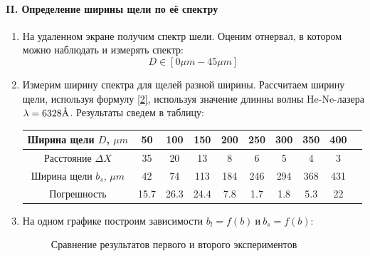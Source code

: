 \documentclass[12pt]{article}
\let\oldAA\AA
\renewcommand{\AA}{\text{\normalfont\oldAA}}
\begin{document}
\paragraph{II. Определение ширины щели по её спектру}
\begin{enumerate}
    \item На удаленном экране получим спектр шели. Оценим отнервал, в котором можно наблюдать и измерять спектр: \\
    \[ D \in [ 0\mu m - 45\mu m ] \]
    
    \item Измерим ширину спектра для щелей разной ширины. Рассчитаем ширину щели, используя формулу \ref{2}, используя значение длинны волны He-Ne-лазера $ \lambda = 6328 \AA $. Результаты сведем в таблицу:\\
    \begin{tabu} to 1\textwidth{|c|c|c|c|c|c|c|c|c|c|}
    \hline
    Ширина щели $D$, $\mu m$ & 50 & 100 & 150 & 200 & 250 & 300 & 350 & 400 \\
    \hline
    Расстояние $\Delta X$ & 35 & 20 & 13 & 8 & 6 & 5 & 4 & 3 \\
    \hline
    Ширина щели $b_s$, $\mu m$ & 42 & 74 & 113 & 184 & 246 & 294 & 368 & 431 \\
    \hline
    Погрешность & 15.7 & 26.3 & 24.4 & 7.8 & 1.7 & 1.8 & 5.3 & 22 \\
    \hline
    \end{tabu}
    
    \item На одном графике построим зависимости $ b_l = f(b)\ \text{и}\ b_s = f(b) $:
    \begin{figure}[h!]
    \noindent{}
    \caption{Сравнение результатов первого и второго экспериментов}
\end{figure}
    
\end{enumerate}
\end{document}
